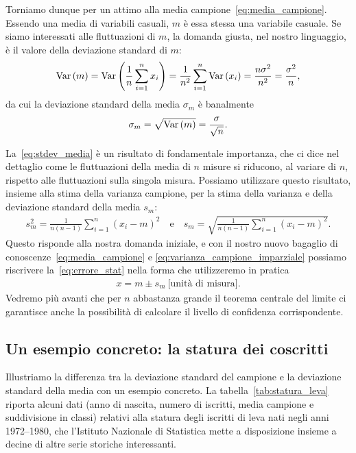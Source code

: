 Torniamo dunque per un attimo alla media campione~\eqref{eq:media_campione}.
Essendo una media di variabili casuali, $m$ è essa stessa una variabile
casuale. Se siamo interessati alle fluttuazioni di $m$, la domanda giusta, nel
nostro linguaggio, è il valore della deviazione standard di $m$:
\begin{align}
  \text{Var}\left(m\right) = \text{Var}\left(\frac{1}{n}\sum_{i = 1}^n x_i\right) =
  \frac{1}{n^2}\sum_{i = 1}^n \text{Var}\left(x_i\right) = \frac{n\sigma^2}{n^2} =
  \frac{\sigma^2}{n},
\end{align}
da cui la deviazione standard della media $\sigma_m$ è banalmente
\begin{align}\label{eq:stdev_media}
  \sigma_m = \sqrt{\text{Var}\left(m\right)} = \frac{\sigma}{\sqrt{n}}.
\end{align}

La~\eqref{eq:stdev_media} è un risultato di fondamentale importanza, che ci
dice nel dettaglio come le fluttuazioni della media di $n$ misure si riducono,
al variare di $n$, rispetto alle fluttuazioni sulla singola misura.
Possiamo utilizzare questo risultato, insieme alla stima della varianza
campione, per la stima della varianza e della deviazione standard della media
$s_m$:
\begin{align}\label{eq:std_media_imparziale}
  s^2_m = \frac{1}{n(n - 1)}\sum_{i = 1}^n (x_i - m)^2 \quad \text{e} \quad
  s_m = \sqrt{\frac{1}{n(n - 1)}\sum_{i = 1}^n (x_i - m)^2}.
\end{align}
Questo risponde alla nostra domanda iniziale, e con il nostro nuovo bagaglio di
conoscenze~\eqref{eq:media_campione} e \eqref{eq:varianza_campione_imparziale}
possiamo riscrivere la~\eqref{eq:errore_stat} nella forma che utilizzeremo in
pratica
\begin{align}
  x = m \pm s_m~\text{[unità di misura].}
\end{align}
Vedremo più avanti che per $n$ abbastanza grande il teorema centrale del limite
ci garantisce anche la possibilità di calcolare il livello di confidenza
corrispondente.


\subsection{Un esempio concreto: la statura dei coscritti}

Illustriamo la differenza tra la deviazione standard del campione e la
deviazione standard della media con un esempio concreto.
La tabella~\ref{tab:statura_leva} riporta alcuni dati (anno di nascita, numero
di iscritti, media campione e suddivisione in classi) relativi alla statura
degli iscritti di leva nati negli anni 1972--1980, che l'Istituto Nazionale di
Statistica mette a disposizione insieme a decine di altre serie storiche
interessanti.

